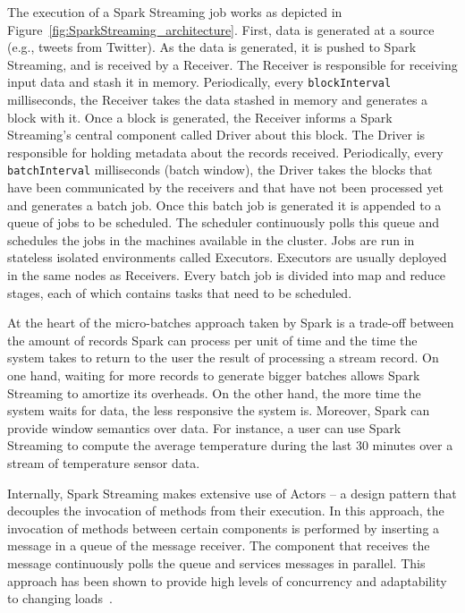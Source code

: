 The execution of a Spark Streaming job works as depicted in Figure~\ref{fig:SparkStreaming_architecture}. 
First, data is generated at a source (e.g., tweets from Twitter). As the data is generated, it is pushed to Spark Streaming, and is received by a Receiver. 
The Receiver is responsible for receiving input data and stash it in memory. Periodically, every \texttt{blockInterval} milliseconds, the Receiver takes the data stashed in memory and generates a block with it.
Once a block is generated, the Receiver informs a Spark Streaming's central component called Driver about this block. The Driver is responsible for holding metadata about the records received. 
Periodically, every \texttt{batchInterval} milliseconds (batch window), the Driver takes the blocks that have been communicated by the receivers and that have not been processed yet and generates a batch job. 
Once this batch job is generated it is appended to a queue of jobs to be scheduled. 
The scheduler continuously polls this queue and schedules the jobs in the machines available in the cluster.
Jobs are run in stateless isolated environments called Executors. Executors are usually deployed in the same nodes as Receivers.
Every batch job is divided into map and reduce stages, each of which contains tasks that need to be scheduled.

At the heart of the micro-batches approach taken by Spark is a trade-off between the amount of records Spark can process per unit of time and the time the system takes to return to the user the result of processing a stream record.
On one hand, waiting for more records to generate bigger batches allows Spark Streaming to amortize its overheads. On the other hand, the more time the system waits for data, the less responsive the system is.
Moreover, Spark can provide window semantics over data. For instance, a user can use Spark Streaming to compute the average temperature during the last 30 minutes over a stream of temperature sensor data.


Internally, Spark Streaming makes extensive use of Actors -- a design pattern that decouples the invocation of methods from their execution. 
In this approach, the invocation of methods between certain components is performed by inserting a message in a queue of the message receiver.
The component that receives the message continuously polls the queue and services messages in parallel.
This approach has been shown to provide high levels of concurrency and adaptability to changing loads~\cite{SEDA}.

